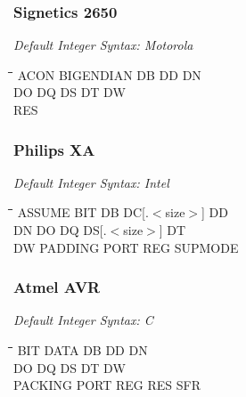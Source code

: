 \subsubsection{Signetics 2650}

{\em Default Integer Syntax: Motorola}

{\tt\begin{tabbing}
\hspace{3cm}\=\hspace{3cm}\=\hspace{3cm}\=\hspace{3cm}\=\kill
ACON       \> BIGENDIAN  \> DB          \> DD          \> DN \\
DO         \> DQ         \> DS          \> DT          \> DW \\
RES \\
\end{tabbing}}

\subsubsection{Philips XA}

{\em Default Integer Syntax: Intel}

{\tt\begin{tabbing}
\hspace{3cm}\=\hspace{3cm}\=\hspace{3cm}\=\hspace{3cm}\=\kill
ASSUME     \> BIT         \> DB          \> DC[.$<$size$>$] \> DD \\
DN         \> DO          \> DQ          \> DS[.$<$size$>$] \> DT \\
DW         \> PADDING     \> PORT        \> REG             \> SUPMODE \\
\end{tabbing}}

\subsubsection{Atmel AVR}

{\em Default Integer Syntax: C}

{\tt\begin{tabbing}
\hspace{3cm}\=\hspace{3cm}\=\hspace{3cm}\=\hspace{3cm}\=\kill
BIT        \> DATA       \> DB          \> DD           \> DN \\
DO         \> DQ         \> DS          \> DT           \> DW \\
PACKING    \> PORT       \> REG         \> RES          \> SFR \\
\end{tabbing}}

